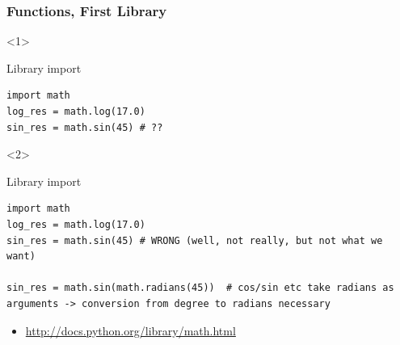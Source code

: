 \documentclass[10pt, a4paper]{beamer} %
\begin{document}
\begin{frame}[t, fragile]\frametitle{Functions, First Library}
  \begin{onlyenv}<1>
    \begin{block}{Library import}
      \begin{lstlisting}
import math
log_res = math.log(17.0)
sin_res = math.sin(45) # ??
  \end{lstlisting}
    \end{block}
  \end{onlyenv}

  \begin{onlyenv}<2>
    \begin{block}{Library import}
      \begin{lstlisting}
import math
log_res = math.log(17.0)
sin_res = math.sin(45) # WRONG (well, not really, but not what we want)

sin_res = math.sin(math.radians(45))  # cos/sin etc take radians as arguments -> conversion from degree to radians necessary
  \end{lstlisting}
    \end{block}
  \end{onlyenv}

  \begin{itemize}
    \item \tiny \url{http://docs.python.org/library/math.html}
  \end{itemize}
\end{frame}
\end{document}
